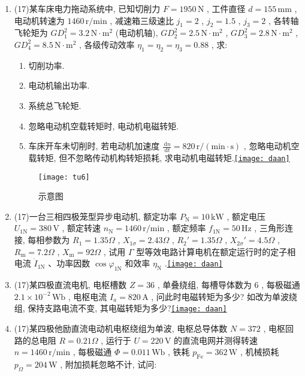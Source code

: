\documentclass[lang=cn,11pt,marginpar=margintrue]{elegantbook}%
\newcommand{\daan}[1]{\hfill\hyperref[#1]{\texttt{[image: daan]}}}
\newcommand{\dd}{\zt{d}}
\newcommand{\zt}[1]{\,\mathrm{#1}}
\newcommand{\NN}{\mathrm{N}}
\begin{document}
\begin{enumerate}
		\begin{enumerate}
			\item 额定负载时的电磁功率和电磁转矩.
			\item 额定负载时的效率.\daan{js:25}
		\end{enumerate}
	\item (17)某车床电力拖动系统中, 已知切削力 $F=1950\zt{N}$ , 工件直径 $d=155\zt{mm}$ , 电动机转速为 $1460\zt{r/min}$ ,  减速箱三级速比 $j_1=2$ , $j_2=1.5$ , $j_3=2$ , 各转轴飞轮矩为 $GD_1^2=3.2\zt{N\cdot m^2}$ (电动机轴), $GD_2^2=2.5\zt{N\cdot m^2}$ , $GD_3^2=2.8\zt{N\cdot m^2}$ , $GD_4^2=8.5\zt{N\cdot m^2}$ , 各级传动效率 $\eta_1=\eta_2=\eta_3=0.88$ , 求:
		\begin{enumerate}
			\item 切削功率.
			\item 电动机输出功率.
			\item 系统总飞轮矩.
			\item 忽略电动机空载转矩时, 电动机电磁转矩.
			\item 车床开车未切削时, 若电动机加速度 $\frac{\dd n}{\dd t}=820\zt{r/(min\cdot s)}$ , 忽略电动机空载转矩, 但不忽略传动机构转矩损耗, 求电动机电磁转矩.\daan{js:26}
		\end{enumerate}
		\begin{figure}[htbp]
			\centering
			\texttt{[image: tu6]}
			\caption{示意图}\label{tu:6}
		\end{figure}
	\item (17)一台三相四极笼型异步电动机, 额定功率 $P_{\NN}=10\zt{kW}$ , 额定电压 $U_{1\NN}=380\zt{V}$ , 额定转速 $n_{\NN}=1460\zt{r/min}$ , 额定频率 $f_{1\NN}=50\zt{Hz}$ , 三角形连接, 每相参数为 $R_1=1.35\Omega$ , $X_{1\sigma}=2.43\Omega$ , $R_2'=1.35\Omega$ , $X_{2\sigma}'=4.5\Omega$ , $R_{\mathrm{m}}=7.2\Omega$ , $X_{\mathrm{m}}=92\Omega$ , 试用 $\Gamma$  型等效电路计算电机在额定运行时的定子相电流 $\dot{I}_{1\NN}$ 、功率因数 $\cos\varphi_{1\NN}$ 和效率 $\eta_{\NN}$ .\daan{js:27}
	\item (17)某四极直流电机, 电枢槽数 $Z=36$ , 单叠绕组, 每槽导体数为 $6$ , 每极磁通 $2.1\times 10^{-2}\zt{Wb}$ , 电枢电流 $I_a=820\zt{A}$ ,  问此时电磁转矩为多少? 如改为单波绕组, 保持支路电流不变, 其电磁转矩为多少?\daan{js:28}
	\item (17)某四极他励直流电动机电枢绕组为单波, 电枢总导体数 $N=372$ , 电枢回路的总电阻 $R=0.21\Omega$ , 运行于 $U=220\zt{V}$ 的直流电网并测得转速 $n=1460\zt{r/min}$ , 每极磁通 $\varPhi=0.011\zt{Wb}$ , 铁耗 $p_{\mathrm{Fe}}=362\zt{W}$ , 机械损耗 $p_{\Omega}=204\zt{W}$ , 附加损耗忽略不计, 试问:

\end{enumerate}
\end{document}

